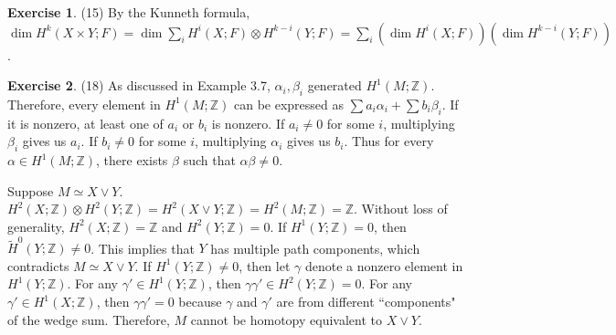 \documentclass[12pt, psamsfonts]{amsart}
\theoremstyle{definition}
\newtheorem*{exer}{Exercise}
\theoremstyle{remark}
\numberwithin{equation}{section}
\begin{document}
\begin{exer}{(15)}
  By the Kunneth formula, $\dim H^k(X \times Y; F) = \dim \sum_i H^i(X; F) \otimes H^{k - i}(Y; F) = \sum_i (\dim H^i(X; F))(\dim H^{k - i}(Y; F))$.
\end{exer}


\begin{exer}{(18)}
  As discussed in Example 3.7, $\alpha_i, \beta_i$ generated $H^1(M; \mathbb{Z})$.
  Therefore, every element in $H^1(M; \mathbb{Z})$ can be expressed as $\sum a_i\alpha_i + \sum b_i\beta_i$.
  If it is nonzero, at least one of $a_i$ or $b_i$ is nonzero.
  If $a_i \ne 0$ for some $i$, multiplying $\beta_i$ gives us $a_i$.
  If $b_i \ne 0$ for some $i$, multiplying $\alpha_i$ gives us $b_i$.
  Thus for every $\alpha \in H^1(M; \mathbb{Z})$, there exists $\beta$ such that $\alpha\beta \ne 0$.

  Suppose $M \simeq X \vee Y$.
  $H^2(X; \mathbb{Z}) \otimes H^2(Y;\mathbb{Z}) = H^2(X \vee Y; \mathbb{Z}) = H^2(M; \mathbb{Z}) = \mathbb{Z}$.
  Without loss of generality, $H^2(X; \mathbb{Z}) = \mathbb{Z}$ and $H^2(Y; \mathbb{Z}) = 0$.
  If $H^1(Y; \mathbb{Z}) = 0$, then $\tilde{H}^0(Y; \mathbb{Z}) \ne 0$.
  This implies that $Y$ has multiple path components, which contradicts $M \simeq X \vee Y$.
  If $H^1(Y; \mathbb{Z}) \ne 0$, then let $\gamma$ denote a nonzero element in $H^1(Y; \mathbb{Z})$.
  For any $\gamma' \in H^1(Y; \mathbb{Z})$, then $\gamma\gamma' \in H^2(Y; \mathbb{Z}) = 0$.
  For any $\gamma' \in H^1(X; \mathbb{Z})$, then $\gamma\gamma' = 0$ because $\gamma$ and $\gamma'$ are from different ``components" of the wedge sum.
  Therefore, $M$ cannot be homotopy equivalent to $X \vee Y$.
\end{exer}
\end{document}
